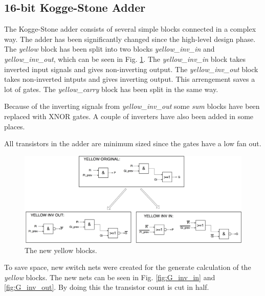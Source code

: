 \subsection{16-bit Kogge-Stone Adder}
The Kogge-Stone adder consists of several simple blocks connected in a complex way. The adder has been significantly changed since the high-level design phase. The \textit{yellow} block has been split into two blocks \textit{yellow\_inv\_in} and \textit{yellow\_inv\_out}, which can be seen in Fig. \ref{fig:yellow_opt}. The \textit{yellow\_inv\_in} block takes inverted input signals and gives non-inverting output. The \textit{yellow\_inv\_out} block takes non-inverted intputs and gives inverting output. This arrengement saves a lot of gates. The \textit{yellow\_carry} block has been split in the same way. 

Because of the inverting signals from \textit{yellow\_inv\_out} some \textit{sum} blocks have been replaced with XNOR gates. A couple of inverters have also been added in some places.

All transistors in the adder are minimum sized since the gates have a low fan out.

\begin{figure}[H]
  \centering
  \captionsetup{justification=centering}
  \includegraphics[scale=0.12]{../figures/yellow_opt}
  \caption{The new yellow blocks.} \label{fig:yellow_opt}
\end{figure}

To save space, new switch nets were created for the generate calculation of the \textit{yellow} blocks. The new nets can be seen in Fig. \ref{fig:G_inv_in} and \ref{fig:G_inv_out}. By doing this the transistor count is cut in half. 

